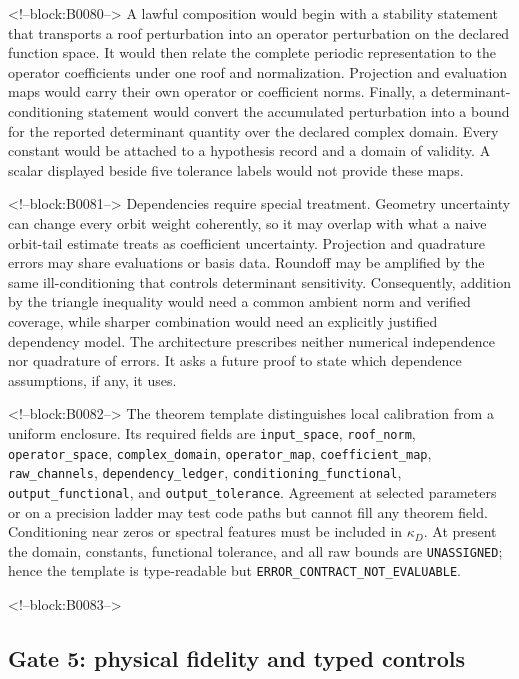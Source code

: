 \documentclass[11pt,a4paper]{article}
\begin{document}
<!--block:B0080-->
A lawful composition would begin with a stability statement that transports a roof perturbation into an operator perturbation on the declared function space. It would then relate the complete periodic representation to the operator coefficients under one roof and normalization. Projection and evaluation maps would carry their own operator or coefficient norms. Finally, a determinant-conditioning statement would convert the accumulated perturbation into a bound for the reported determinant quantity over the declared complex domain. Every constant would be attached to a hypothesis record and a domain of validity. A scalar displayed beside five tolerance labels would not provide these maps.

<!--block:B0081-->
Dependencies require special treatment. Geometry uncertainty can change every orbit weight coherently, so it may overlap with what a naive orbit-tail estimate treats as coefficient uncertainty. Projection and quadrature errors may share evaluations or basis data. Roundoff may be amplified by the same ill-conditioning that controls determinant sensitivity. Consequently, addition by the triangle inequality would need a common ambient norm and verified coverage, while sharper combination would need an explicitly justified dependency model. The architecture prescribes neither numerical independence nor quadrature of errors. It asks a future proof to state which dependence assumptions, if any, it uses.

<!--block:B0082-->
The theorem template distinguishes local calibration from a uniform enclosure. Its required fields are \texttt{input\_space}, \texttt{roof\_norm}, \texttt{operator\_space}, \texttt{complex\_domain}, \texttt{operator\_map}, \texttt{coefficient\_map}, \texttt{raw\_channels}, \texttt{dependency\_ledger}, \texttt{conditioning\_functional}, \texttt{output\_functional}, and \texttt{output\_tolerance}. Agreement at selected parameters or on a precision ladder may test code paths but cannot fill any theorem field. Conditioning near zeros or spectral features must be included in \(\kappa_D\). At present the domain, constants, functional tolerance, and all raw bounds are \texttt{UNASSIGNED}; hence the template is type-readable but \texttt{ERROR\_CONTRACT\_NOT\_EVALUABLE}.

<!--block:B0083-->
\subsection{Gate 5: physical fidelity and typed controls}
\end{document}
